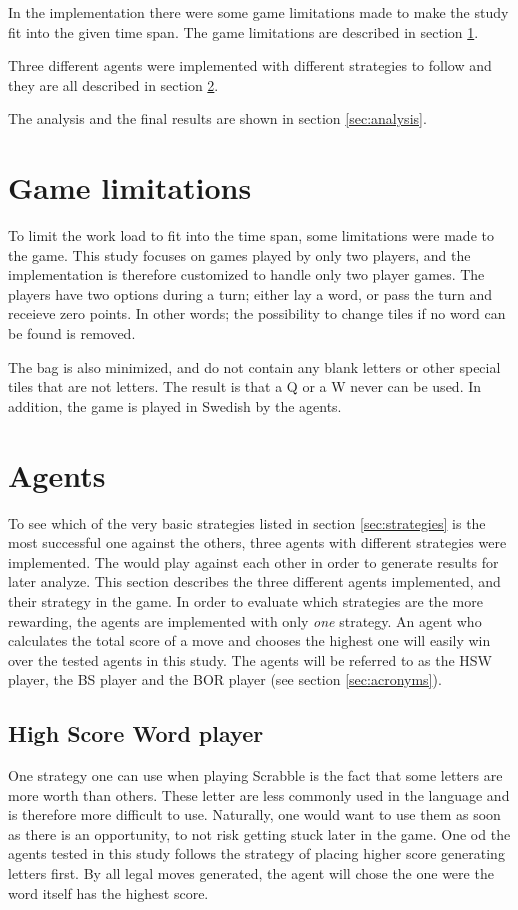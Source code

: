 \documentclass[a4paper, 12pt]{report}
\begin{document}
In the implementation there were some game limitations made to make the study fit into the given time span. The game limitations are described in section \ref{sec:limitations}.

Three different agents were implemented with different strategies to follow and they are all described in section \ref{sec:agents}.

The analysis and the final results are shown in section \ref{sec:analysis}.

\section{Game limitations}
\label{sec:limitations}
To limit the work load to fit into the time span, some limitations were made to the game. This study focuses on games played by only two players, and the implementation is therefore customized to handle only two player games. The players have two options during a turn; either lay a word, or pass the turn and receieve zero points. In other words; the possibility to change tiles if no word can be found is removed. 

The bag is also minimized, and do not contain any blank letters or other special tiles that are not letters. The result is that a Q or a W never can be used. In addition, the game is played in Swedish by the agents.

\section{Agents}
\label{sec:agents}
To see which of the very basic strategies listed in section \ref{sec:strategies} is the most successful one against the others, three agents with different strategies were implemented. The would play against each other in order to generate results for later analyze. This section describes the three different agents implemented, and their strategy in the game. In order to evaluate which strategies are the more rewarding, the agents are implemented with only \emph{one} strategy. An agent who calculates the total score of a move and chooses the highest one will easily win over the tested agents in this study. The agents will be referred to as the HSW player, the BS player and the BOR player (see section \ref{sec:acronyms}).

\subsection{High Score Word player}
One strategy one can use when playing Scrabble is the fact that some letters are more worth than others. These letter are less commonly used in the language and is therefore more difficult to use. Naturally, one would want to use them as soon as there is an opportunity, to not risk getting stuck later in the game. One od the agents tested in this study follows the strategy of placing higher score generating letters first. By all legal moves generated, the agent will chose the one were the word itself has the highest score. 
\end{document}
